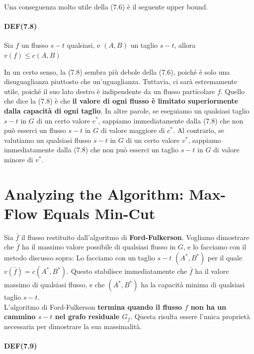 Una conseguenza molto utile della (7.6) è il seguente upper bound.


\paragraph{DEF(7.8)}

\begin{myblockquote}
Sia $f$ un flusso $s-t$ qualsiasi, e $(A, B)$ un taglio $s-t$, allora 
$
    v(f) \le c(A, B)
$
\end{myblockquote}

In un certo senso, la (7.8) sembra più debole della (7.6), poiché è solo
una disuguaglianza piuttosto che un'uguaglianza. Tuttavia, ci sarà
estremamente utile, poiché il suo lato destro è indipendente da un
flusso particolare $f$. Quello che dice la (7.8) è che \textbf{il
valore di ogni flusso è limitato superiormente dalla capacità di ogni
taglio}. In altre parole, se eseguiamo un qualsiasi taglio $s-t$ in
$G$ di un certo valore $c^{*}$, sappiamo immediatamente dalla (7.8)
che non può esserci un flusso $s-t$ in $G$ di valore maggiore di
$c^{*}$. Al contrario, se valutiamo un qualsiasi flusso $s-t$ in $G$
di un certo valore $v^{*}$, sappiamo immediatamente dalla (7.8) che non
può esserci un taglio $s-t$ in $G$ di valore minore di $v^{*}$.

\section{Analyzing the Algorithm: Max-Flow Equals Min-Cut}

Sia $\bar{f}$ il flusso restituito dall'algoritmo di
\textbf{Ford-Fulkerson}. Vogliamo dimostrare che $\bar{f}$ ha il
massimo valore possibile di qualsiasi flusso in $G$, e lo facciamo con
il metodo discusso sopra: Lo facciamo con un taglio $s-t$
$(A^{*} , B^{*})$ per il quale $v(\bar{f}) = c(A^{*} , B^{*})$. Questo
stabilisce immediatamente che $\bar{f}$ ha il valore massimo di
qualsiasi flusso, e che $(A^{*} , B^{*})$ ha la capacità minima di
qualsiasi taglio $s-t$.\\

L'algoritmo di Ford-Fulkerson \textbf{termina quando il flusso $f$ non
ha un cammino $s-t$ nel grafo residuale $G_f$}. Questa risulta
essere l'unica proprietà necessaria per dimostrare la sua massimalità.\\

\paragraph{DEF(7.9)}

